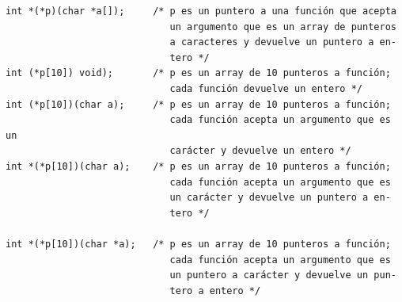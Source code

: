 \documentclass{article}
\begin{document}
\begin{verbatim}
int *(*p)(char *a[]);     /* p es un puntero a una función que acepta
                             un argumento que es un array de punteros
                             a caracteres y devuelve un puntero a en-
                             tero */
int (*p[10]) void);       /* p es un array de 10 punteros a función;
                             cada función devuelve un entero */
int (*p[10])(char a);     /* p es un array de 10 punteros a función;
                             cada función acepta un argumento que es un
                             carácter y devuelve un entero */
int *(*p[10])(char a);    /* p es un array de 10 punteros a función;
                             cada función acepta un argumento que es
                             un carácter y devuelve un puntero a en-
                             tero */

int *(*p[10])(char *a);   /* p es un array de 10 punteros a función;
                             cada función acepta un argumento que es
                             un puntero a carácter y devuelve un pun-
                             tero a entero */
\end{verbatim}
\end{document}
